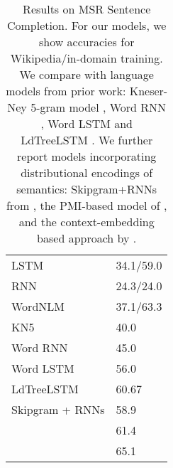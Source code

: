 
\begin{table}[t]
  \begin{small}
    \begin{center}
      \begin{tabular}{l|l}
        LSTM 	    &      34.1/59.0 \\ %
        RNN  &     24.3/24.0 \\ %
        WordNLM & 37.1/63.3 \\ \hline %
        KN5   & 40.0 \\
        Word RNN & 45.0 \\
        Word LSTM & 56.0 \\ 
        LdTreeLSTM  & 60.67 \\	    \hline
        Skipgram + RNNs  & 58.9 \\
        \citet{woods2016exploiting} &  61.4 \\
        \citet{melamud2016context2vec} & 65.1 \\
      \end{tabular}
    \end{center}
  \end{small}
  \caption{\label{tab:msr-completion-results} Results on MSR Sentence Completion. For our models, we show accuracies for  Wikipedia/in-domain training. We compare with language models from prior work: Kneser-Ney 5-gram model \cite{Mikolov:2012}, Word RNN \cite{zweig2012computational}, Word LSTM and LdTreeLSTM \cite{zhang2016top}. We further report models incorporating distributional encodings of semantics: Skipgram+RNNs from , the PMI-based model of \citet{woods2016exploiting}, and the context-embedding based approach by \citet{melamud2016context2vec}.}
\end{table}






